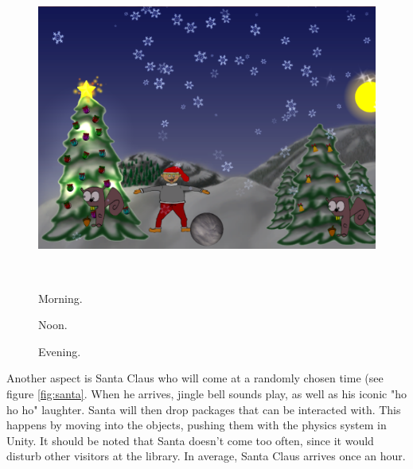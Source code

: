 \begin{figure}[htbp]
\begin{minipage}[b]{0.3\textwidth}
	\end{minipage}\hfill	
	\begin{minipage}[b]{0.3\textwidth}\centering
		\includegraphics[width=1.00\textwidth]{Pictures/Design/time3.png} %
	\end{minipage}\\ %
	\begin{minipage}[t]{0.3\textwidth}
		\caption{Morning.} %
		\label{fig:time1}
	\end{minipage}\hfill
	\begin{minipage}[t]{0.3\textwidth}
		\caption{Noon.} %
		\label{fig:time2}
	\end{minipage}\hfill	
	\begin{minipage}[t]{0.3\textwidth}
		\caption{Evening.} %
		\label{fig:time3}
	\end{minipage}
\end{figure}

Another aspect is Santa Claus who will come at a randomly chosen time (see figure \ref{fig:santa}. When he arrives, jingle bell sounds play, as well as his iconic "ho ho ho" laughter. Santa will then drop packages that can be interacted with. This happens by moving into the objects, pushing them with the physics system in Unity. It should be noted that Santa doesn't come too often, since it would disturb other visitors at the library. In average, Santa Claus arrives once an hour.

